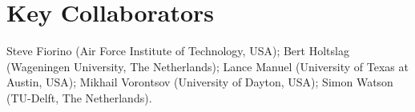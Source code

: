 \section{Key Collaborators}

Steve Fiorino (Air Force Institute of Technology, USA); Bert Holtslag (Wageningen University, The Netherlands); Lance Manuel (University of Texas at Austin, USA); Mikhail Vorontsov (University of Dayton, USA); Simon Watson (TU-Delft, The Netherlands).
